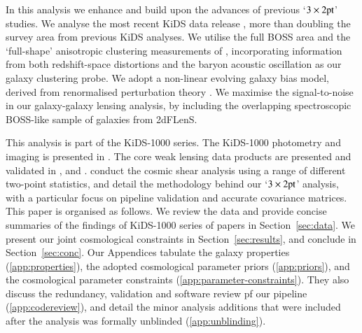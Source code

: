    In this analysis we enhance and build upon the advances of previous `$3\times
   2{\rm pt}$' studies.   We analyse the most recent KiDS data release \citep[KiDS-1000,][]{kuijken/etal:2019}, more than doubling the
   survey area from previous KiDS analyses.   We utilise the full BOSS
   area and the `full-shape' anisotropic clustering measurements of \citet{sanchez/etal:2017},
   incorporating information from both redshift-space distortions
   and the baryon acoustic oscillation as our galaxy clustering probe.   We adopt a non-linear
   evolving galaxy bias model, derived from renormalised perturbation theory
   \citep{crocce/scoccimarro:2006, chan/etal:2012}.   We maximise the signal-to-noise in our galaxy-galaxy lensing analysis, 
   by including the overlapping spectroscopic BOSS-like sample of galaxies from 2dFLenS.

This analysis is part of the KiDS-1000 series.  The KiDS-1000 photometry and imaging is presented in \citet{kuijken/etal:2019}.  The core weak lensing data products are presented and validated in \citet[shear measurements,][]{giblin/etal:inprep},  and  \citet[redshift measurements,][]{hildebrandt/etal:inprep}.   \citet{asgari/etal:inprep} conduct the cosmic shear analysis using a range of different two-point statistics, and \citet{joachimi/etal:inprep} detail the methodology behind our `$3\times
   2{\rm pt}$'  analysis, with a particular focus on pipeline validation and accurate covariance matrices.   This paper is organised as follows.   We review the data and provide concise summaries of the findings of KiDS-1000 series of papers in Section~\ref{sec:data}.   We present our joint cosmological constraints in Section~\ref{sec:results}, and conclude in Section~\ref{sec:conc}.  Our Appendices tabulate the galaxy properties (\ref{app:properties}), the adopted cosmological parameter priors (\ref{app:priors}),  and the cosmological parameter constraints (\ref{app:parameter-constraints}).   They also discuss the redundancy, validation and software review pf our pipeline (\ref{app:codereview}), and detail the minor analysis additions that were included after the analysis was formally unblinded (\ref{app:unblinding}).


   











   